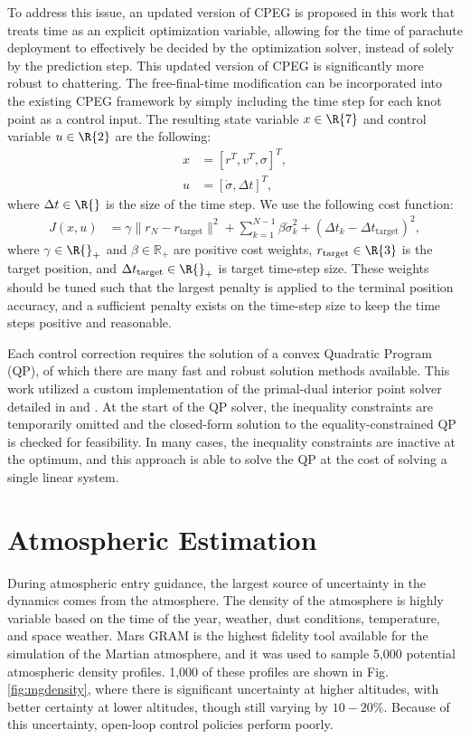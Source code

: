  To address this issue, an updated version of CPEG is proposed in this work that treats time as an explicit optimization variable, allowing for the time of parachute deployment to effectively be decided by the optimization solver, instead of solely by the prediction step. This updated version of CPEG is significantly more robust to chattering. The free-final-time modification can be incorporated into the existing CPEG framework by simply including the time step for each knot point as a control input. The resulting state variable $x \in \R{7}$ and control variable $u \in \R{2}$ are the following:
\begin{align}
    x &= [r^T, v^T, \sigma]^T, \\ 
    u &= [\dot{\sigma}, \Delta t]^T,
\end{align}
where $\Delta t \in \R{}$ is the size of the time step. We use the following cost function:
\begin{align}
    J(x,u) &= \gamma \|r_N - r_\text{target}\|^2 + \sum_{k=1}^{N-1} \beta \dot{\sigma}_k^2  + (\Delta t_k - \Delta t_\text{target})^2 ,
\end{align}
where $\gamma \in \R{}_+$ and $\beta \in \mathbb{R}_+$ are positive cost weights, $r_\text{target} \in \R{3}$ is the target position, and $\Delta t_\text{target} \in \R{}_+$ is target time-step size. These weights should be tuned such that the largest penalty is applied to the terminal position accuracy, and a sufficient penalty exists on the time-step size to keep the time steps positive and reasonable.

Each control correction requires the solution of a convex Quadratic Program (QP), of which there are many fast and robust solution methods available. This work utilized a custom implementation of the primal-dual interior point solver detailed in \cite{mattingley2012} and \cite{vandenberghe}. At the start of the QP solver, the inequality constraints are temporarily omitted and the closed-form solution to the equality-constrained QP is checked for feasibility. In many cases, the inequality constraints are inactive at the optimum, and this approach is able to solve the QP at the cost of solving a single linear system. 
\section{Atmospheric Estimation}\label{sec:cpeg2:section5}
During atmospheric entry guidance, the largest source of uncertainty in the dynamics comes from the atmosphere. The density of the atmosphere is highly variable based on the time of the year, weather, dust conditions, temperature, and space weather. Mars GRAM \cite{justh2013} is the highest fidelity tool available for the simulation of the Martian atmosphere, and it was used to sample 5,000 potential atmospheric density profiles. 1,000 of these profiles are shown in Fig. \ref{fig:mgdensity}, where there is significant uncertainty at higher altitudes, with better certainty at lower altitudes, though still varying by $10-20\%$. Because of this uncertainty, open-loop control policies perform poorly. 

